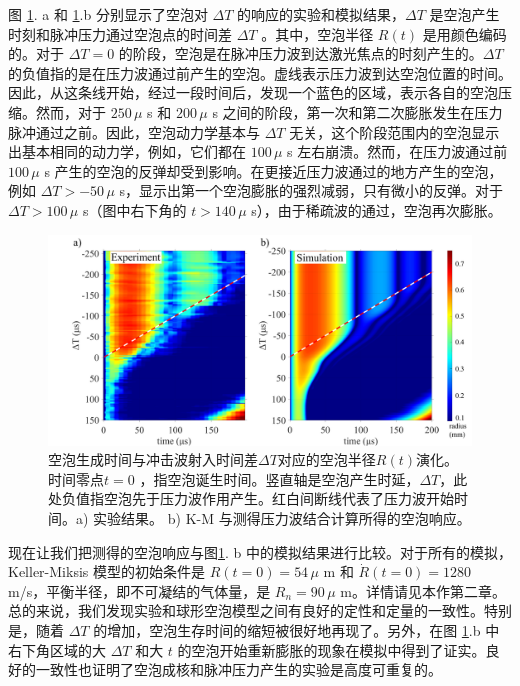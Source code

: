 图 \ref{fig:5.14}. a 和 \ref{fig:5.14}.b 分别显示了空泡对 $\Delta T$
的响应的实验和模拟结果，$\Delta T$
是空泡产生时刻和脉冲压力通过空泡点的时间差 $\Delta T$ 。其中，空泡半径
$R(t)$ 是用颜色编码的。对于 $\Delta T=0$
的阶段，空泡是在脉冲压力波到达激光焦点的时刻产生的。$\Delta T$
的负值指的是在压力波通过前产生的空泡。虚线表示压力波到达空泡位置的时间。因此，从这条线开始，经过一段时间后，发现一个蓝色的区域，表示各自的空泡压缩。然而，对于
$250\,\mu$ s 和 $200\,\mu$ s
之间的阶段，第一次和第二次膨胀发生在压力脉冲通过之前。因此，空泡动力学基本与
$\Delta T$
无关，这个阶段范围内的空泡显示出基本相同的动力学，例如，它们都在
$100\,\mu$ s 左右崩溃。然而，在压力波通过前 $100\,\mu$ s
产生的空泡的反弹却受到影响。在更接近压力波通过的地方产生的空泡，例如
$\Delta T>-50\,\mu$
s，显示出第一个空泡膨胀的强烈减弱，只有微小的反弹。对于
$\Delta T>100\,\mu$ s（图中右下角的 $t>140\,\mu$
s），由于稀疏波的通过，空泡再次膨胀。

\begin{figure}[H]
  \centering
  \includegraphics[width=1\linewidth]{img/fig5.14.pdf}
  \caption[空泡生成时间与冲击波射入时间差$\Delta T$对应的空泡半径$R (t)$演化]{空泡生成时间与冲击波射入时间差$\Delta T$对应的空泡半径$R (t)$演化。时间零点$t=0$
，指空泡诞生时间。竖直轴是空泡产生时延，$\Delta T$，此处负值指空泡先于压力波作用产生。红白间断线代表了压力波开始时间。a)
实验结果。 b) K-M 与测得压力波结合计算所得的空泡响应。
}
  \label{fig:5.14}
\end{figure}

现在让我们把测得的空泡响应与图\ref{fig:5.14}. b
中的模拟结果进行比较。对于所有的模拟，Keller-Miksis 模型的初始条件是
$R(t=0)=54\,\mu$ m 和 $\dot{R}(t=0)=1280\,$
m/s，平衡半径，即不可凝结的气体量，是 $R_n=90\,\mu$
m。详情请见本作第二章。总的来说，我们发现实验和球形空泡模型之间有良好的定性和定量的一致性。特别是，随着
$\Delta T$ 的增加，空泡生存时间的缩短被很好地再现了。另外，在图 \ref{fig:5.14}.b
中右下角区域的大 $\Delta T$ 和大 $t$
的空泡开始重新膨胀的现象在模拟中得到了证实。良好的一致性也证明了空泡成核和脉冲压力产生的实验是高度可重复的。

